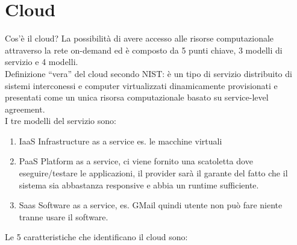 \documentclass[11pt, twocolumn]{article}
\newenvironment{myenumerate}
{ \begin{enumerate}
		\setlength{\itemsep}{0pt}
		\setlength{\parskip}{0pt}
		\setlength{\parsep}{0pt}     }
	{ \end{enumerate}                  }
\begin{document}
\section{Cloud}
Cos'è il cloud? La possibilità di avere accesso alle risorse computazionale attraverso la rete on-demand ed è composto da 5 punti chiave, 3 modelli di servizio e 4 modelli. 
\\
Definizione ``vera'' del cloud secondo NIST: è un tipo di servizio distribuito di sistemi interconessi e computer virtualizzati dinamicamente provisionati e presentati come un unica risorsa computazionale basato su service-level agreement.
\\
I tre modelli del servizio sono:

\begin{myenumerate}
	\item IaaS Infrastructure as a service es. le macchine virtuali
	\item PaaS Platform as a service, ci viene fornito una scatoletta dove eseguire/testare le applicazioni, il provider sarà il garante del fatto che il sistema sia abbastanza responsive e abbia un runtime sufficiente.
	\item Saas Software as a service, es. GMail quindi utente non può fare niente tranne usare il software.
\end{myenumerate}
Le 5 caratteristiche che identificano il cloud sono:
\end{document}
